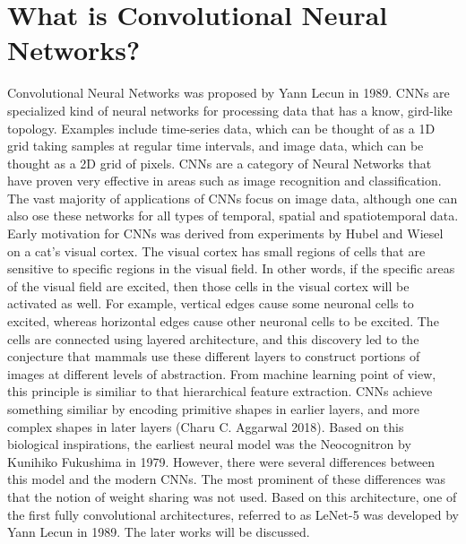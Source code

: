 \documentclass[11pt]{article}
\begin{document}
\section{What is Convolutional Neural Networks?}
\hspace*{1cm} Convolutional Neural Networks was proposed by Yann Lecun in 1989. CNNs are specialized kind of neural networks for processing data that has a know, gird-like topology. Examples include time-series data, which can be thought of as a 1D grid taking samples at regular time intervals, and image data, which can be thought as a 2D grid of pixels. CNNs are a category of Neural Networks that have proven very effective in areas such as image recognition and classification. The vast majority of applications of CNNs focus on image data, although one can also ose these networks for all types of temporal, spatial and spatiotemporal data.\cite{GoodBengCour16}\\
Early motivation for CNNs was derived from experiments by Hubel and Wiesel on a cat's visual cortex. The visual cortex has small regions of cells that are sensitive to specific regions in the visual field. In other words, if the specific areas of the visual field are excited, then those cells in the visual cortex will be activated as well. For example, vertical edges cause some neuronal cells to excited, whereas horizontal edges cause other neuronal cells to be excited. The cells are connected using layered architecture, and this discovery led to the conjecture that mammals use these different layers to construct portions of images at different levels of abstraction. From machine learning point of view, this principle is similiar to that hierarchical feature extraction. CNNs achieve something similiar by encoding primitive shapes in earlier layers, and more complex shapes in later layers (Charu C. Aggarwal 2018).
Based on this biological inspirations, the earliest neural model was the Neocognitron by Kunihiko Fukushima in 1979. However, there were several differences between this model and the modern CNNs. The most prominent of these differences was that the notion of weight sharing was not used. Based on this architecture, one of the first fully convolutional architectures, referred to as LeNet-5 was developed by Yann Lecun in 1989. The later works will be discussed. 
\end{document}

